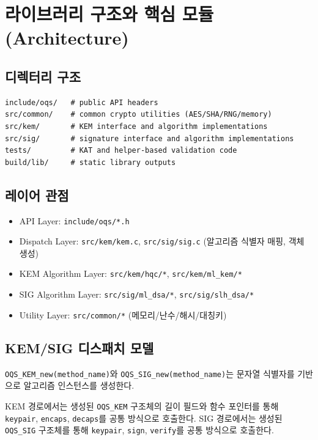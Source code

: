\section{라이브러리 구조와 핵심 모듈 (Architecture)}

\subsection{디렉터리 구조}
\begin{lstlisting}[style=cstyle,caption={핵심 디렉터리 개요}]
include/oqs/   # public API headers
src/common/    # common crypto utilities (AES/SHA/RNG/memory)
src/kem/       # KEM interface and algorithm implementations
src/sig/       # signature interface and algorithm implementations
tests/         # KAT and helper-based validation code
build/lib/     # static library outputs
\end{lstlisting}

\subsection{레이어 관점}
\begin{itemize}[leftmargin=*]
\item API Layer: \texttt{include/oqs/*.h}
\item Dispatch Layer: \texttt{src/kem/kem.c}, \texttt{src/sig/sig.c} (알고리즘 식별자 매핑, 객체 생성)
\item KEM Algorithm Layer: \texttt{src/kem/hqc/*}, \texttt{src/kem/ml\_kem/*}
\item SIG Algorithm Layer: \texttt{src/sig/ml\_dsa/*}, \texttt{src/sig/slh\_dsa/*}
\item Utility Layer: \texttt{src/common/*} (메모리/난수/해시/대칭키)
\end{itemize}

\subsection{KEM/SIG 디스패치 모델}
\texttt{OQS\_KEM\_new(method\_name)}와 \texttt{OQS\_SIG\_new(method\_name)}는
문자열 식별자를 기반으로 알고리즘 인스턴스를 생성한다.

KEM 경로에서는 생성된 \texttt{OQS\_KEM} 구조체의 길이 필드와 함수 포인터를 통해
\texttt{keypair}, \texttt{encaps}, \texttt{decaps}를 공통 방식으로 호출한다.
SIG 경로에서는 생성된 \texttt{OQS\_SIG} 구조체를 통해
\texttt{keypair}, \texttt{sign}, \texttt{verify}를 공통 방식으로 호출한다.

